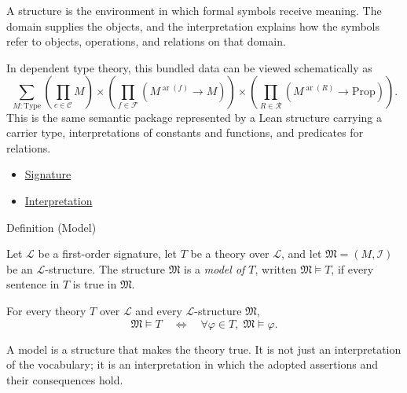\begin{remark*}[Interpretation]
A structure is the environment in which formal symbols receive meaning. The
domain supplies the objects, and the interpretation explains how the symbols
refer to objects, operations, and relations on that domain.
\end{remark*}

\begin{remark*}[Exposition]
In dependent type theory, this bundled data can be viewed schematically as
\[
\sum_{M:\mathrm{Type}}
\left(\prod_{c\in\mathcal{C}} M\right)
\times
\left(\prod_{f\in\mathcal{F}}(M^{\operatorname{ar}(f)}\to M)\right)
\times
\left(\prod_{R\in\mathcal{R}}(M^{\operatorname{ar}(R)}\to \mathrm{Prop})\right).
\]
This is the same semantic package represented by a Lean structure carrying a
carrier type, interpretations of constants and functions, and predicates for
relations.
\end{remark*}

\begin{dependencies}
\begin{itemize}
  \item \hyperref[def:signature]{Signature}
  \item \hyperref[def:axiom-systems-interpretation]{Interpretation}
\end{itemize}
\end{dependencies}

\begin{definitionbox}{Definition (Model)}
\begin{definition}[Model]
\label{def:axiom-systems-model}
Let $\mathcal{L}$ be a first-order signature, let $T$ be a theory over
$\mathcal{L}$, and let $\mathfrak{M}=(M,\mathcal{I})$ be an
$\mathcal{L}$-structure. The structure $\mathfrak{M}$ is a \emph{model of
$T$}, written $\mathfrak{M}\vDash T$, if every sentence in $T$ is true in
$\mathfrak{M}$.
\end{definition}
\end{definitionbox}

\begin{remark*}
For every theory $T$ over $\mathcal{L}$ and every $\mathcal{L}$-structure
$\mathfrak{M}$,
\[
  \mathfrak{M}\vDash T
  \quad\Longleftrightarrow\quad
  \forall \varphi\in T,\; \mathfrak{M}\vDash \varphi.
\]
\end{remark*}

\begin{remark*}[Interpretation]
A model is a structure that makes the theory true. It is not just an
interpretation of the vocabulary; it is an interpretation in which the adopted
assertions and their consequences hold.
\end{remark*}

